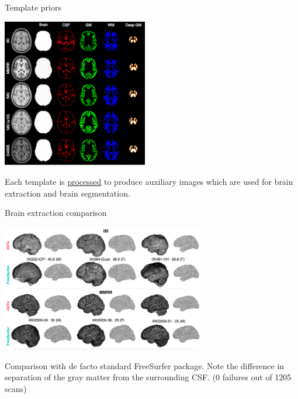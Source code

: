 \documentclass[ignorenonframetext,]{beamer}
\begin{document}
\begin{frame}{Template priors}

\begin{centering}

\includegraphics[width=2.5in]{./evaluation/figures/templatePriors.png}

\end{centering}

\small

Each template is
\href{https://github.com/ntustison/antsCookTemplatePriorsExample}{processed}
to produce auxiliary images which are used for brain extraction and
brain segmentation.

\end{frame}

\begin{frame}{Brain extraction comparison}

\begin{centering}

\includegraphics[width=3.5in]{./evaluation/figures/brainExtraction.png}

\end{centering}

\small

Comparison with de facto standard FreeSurfer package. Note the
difference in separation of the gray matter from the surrounding CSF. (0
failures out of 1205 scans)

\end{frame}
\end{document}
